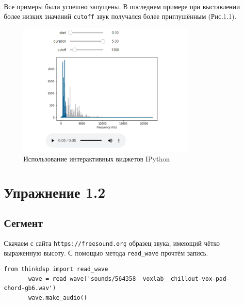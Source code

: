 \documentclass[a4paper,12pt]{report}
\begin{document}
    Все примеры были успешно запущены. В последнем примере при выставлении более низких значений \texttt{cutoff} звук получался более приглушённым (Рис.1.1).
\begin{figure}[H]
        \centering
        \includegraphics[width=0.8\textwidth]{fig1-1.PNG}
        \caption{Использование интерактивных виджетов IPython}
        \label{fig:fig1-1}
\end{figure}

\chapter{Упражнение 1.2}
\section{Сегмент}
    Скачаем с сайта \texttt{https://freesound.org} образец звука, имеющий чётко выраженную высоту. С помощью метода \texttt{read\_wave} прочтём запись. 
\begin{lstlisting}[caption=Чтение записи]
       from thinkdsp import read_wave
       wave = read_wave('sounds/564358__voxlab__chillout-vox-pad-chord-gb6.wav')
       wave.make_audio()
\end{lstlisting}
\end{document}
